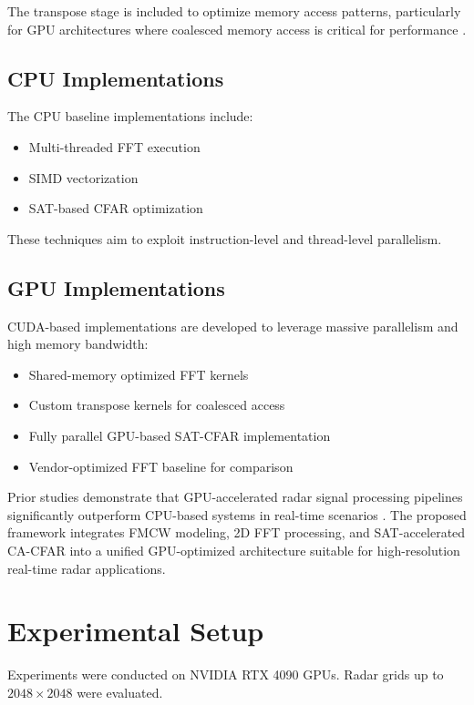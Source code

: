 \documentclass[conference, a4paper]{IEEEtran}
\begin{document}
The transpose stage is included to optimize memory access patterns, particularly for GPU architectures where coalesced memory access is critical for performance \cite{liu2023,zhao2023}.

\subsection{CPU Implementations}

The CPU baseline implementations include:

\begin{itemize}
    \item Multi-threaded FFT execution
    \item SIMD vectorization
    \item SAT-based CFAR optimization
\end{itemize}

These techniques aim to exploit instruction-level and thread-level parallelism.

\subsection{GPU Implementations}

CUDA-based implementations are developed to leverage massive parallelism and high memory bandwidth:

\begin{itemize}
    \item Shared-memory optimized FFT kernels
    \item Custom transpose kernels for coalesced access
    \item Fully parallel GPU-based SAT-CFAR implementation
    \item Vendor-optimized FFT baseline for comparison
\end{itemize}

Prior studies demonstrate that GPU-accelerated radar signal processing pipelines significantly outperform CPU-based systems in real-time scenarios \cite{jung2023,zhao2023,liu2023}. The proposed framework integrates FMCW modeling, 2D FFT processing, and SAT-accelerated CA-CFAR into a unified GPU-optimized architecture suitable for high-resolution real-time radar applications.


\section{Experimental Setup}

Experiments were conducted on NVIDIA RTX 4090 GPUs. Radar grids up to $2048 \times 2048$ were evaluated. 
\end{document}
